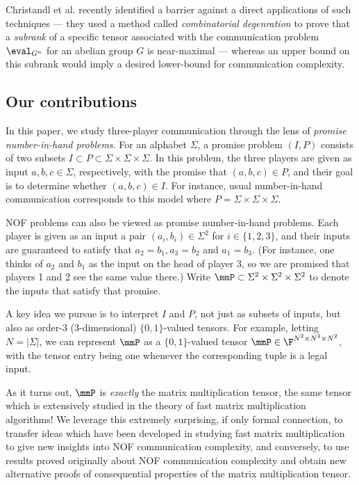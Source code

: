  Christandl et al. \cite{CFTZ21} recently identified a barrier against a direct applications of such techniques --- they used a method called \emph{combinatorial degenration} to prove that a \emph{subrank} of a specific tensor associated with the communication problem $\eval_{G^n}$ for an abelian group $G$ is near-maximal --- whereas an upper bound on this subrank would imply a desired lower-bound for communication complexity.



\subsection{Our contributions}
In this paper, we study three-player communication through the lens of \emph{promise number-in-hand problems}. For an alphabet $\Sigma$, a promise problem $(I,P)$ consists of two subsets $I \subset P \subset \Sigma \times \Sigma \times \Sigma$. In this problem, the three players are given as input $a,b,c \in \Sigma$, respectively, with the promise that $(a,b,c) \in P$, and their goal is to determine whether $(a,b,c) \in I$. For instance, usual number-in-hand communication corresponds to this model where $P = \Sigma \times \Sigma \times \Sigma$.

NOF problems can also be viewed as promise number-in-hand problems. Each player is given as an input a pair $(a_i, b_i) \in \Sigma^2$ for $i \in \{1, 2,3\}$, and their inputs are guaranteed to satisfy that $a_2 = b_1, a_3 = b_2$ and $a_1 = b_3$. (For instance, one thinks of $a_2$ and $b_1$ as the input on the head of player 3, so we are promised that players 1 and 2 see the same value there.) Write $\mmP \subset \Sigma^2 \times \Sigma^2 \times \Sigma^2$ to denote the inputs that satisfy that promise.

A key idea we pursue is to interpret $I$ and $P$, not just as subsets of inputs, but also as order-3 (3-dimensional) $\{0,1\}$-valued tensors. For example, letting $N = |\Sigma|$, we can represent $\mmP$ as a $\{0,1\}$-valued tensor $\mmP \in \F^{N^2 \times N^2 \times N^2}$, with the tensor entry being one whenever the corresponding tuple is a legal input.

As it turns out, $\mmP$ is \emph{exactly} the matrix multiplication tensor, the same tensor which is extensively studied in the theory of fast matrix multiplication algorithms! We leverage this extremely surprising, if only formal connection, to transfer ideas which have been developed in studying fast matrix multiplication to give new insights into NOF communication complexity, and conversely, to use results proved originally about NOF communication complexity and obtain new alternative proofs of consequential properties of the matrix multiplication tensor.


